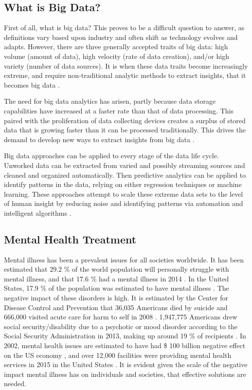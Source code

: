 \documentclass[sigconf]{acmart}
\begin{document}
\subsection {What is Big Data?}

First of all, what is big data? This proves to be a difficult question to answer, as definitions vary based upon industry and often shift as technology evolves and adapts. However, there are three generally accepted traits of big data: high volume (amount of data), high velocity (rate of data creation), and/or high variety (number of data sources). It is when these data traits become increasingly extreme, and require non-traditional analytic methods to extract insights, that it becomes big data \cite{bdconcepts}. 

The need for big data analytics has arisen, partly because data storage capabilities have increased at a faster rate than that of data processing. This paired with the proliferation of data collecting devices creates a surplus of stored data that is growing faster than it can be processed traditionally. This drives the demand to develop new ways to extract insights from big data \cite{bdsurvey}. 

Big data approaches can be applied to every stage of the data life cycle. Unworked data can be extracted from varied and possibly streaming sources and cleaned and organized automatically. Then predictive analytics can be applied to identify patterns in the data, relying on either regression techniques or machine learning. These approaches attempt to scale these extreme data sets to the level of human insight by reducing noise and identifying patterns via automation and intelligent algorithms \cite{bdconcepts}.

\subsection{Mental Health Treatment}

Mental illness has been a prevalent issues for all societies worldwide. It has been estimated that 29.2 \% of the world population will personally struggle with mental illness, and that 17.6 \%  had a mental illness in 2014 \cite{worldprev}. In the United States, 17.9 \% of the population was estimated to have mental illness \cite{nihmstats}. The negative impact of these disorders is high. It is estimated by the Center for Disease Control and Prevention that 36,035 Americans died by suicide and 666,000 visited acute care for harm to self in 2008 \cite{cdcsuicide}. 1,947,775 Americans drew social security/disability due to a psychotic or mood disorder according to the Social Security Administration in 2013, making up around 19 \% of recipients \cite{ssarecipients}. In 2002, mental health issues are estimated to have had \$ 100 billion negative effect on the US economy \cite{nihmstats}, and over 12,000 facilities were providing mental health services in 2015 in the United States \cite{n-mhss2015}. It is evident given the scale of the negative impact mental illness has on individuals and societies, that effective solutions are needed.
\end{document}
